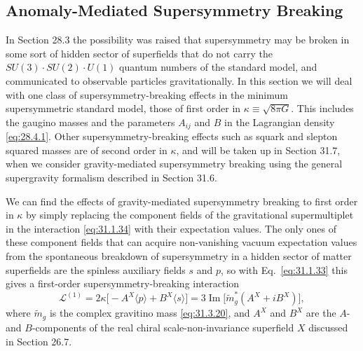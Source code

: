 
\subsection{Anomaly-Mediated Supersymmetry Breaking}

In Section 28.3 the possibility was raised that supersymmetry may be broken
in some sort of hidden sector of superfields that do not carry the
\(SU(3)\mathbin{\cdot}SU(2)\mathbin{\cdot}U(1)\) quantum numbers of the
standard model, and communicated to observable particles gravitationally.
In this section we will deal with one class of supersymmetry-breaking
effects in the minimum supersymmetric standard model, those of first order
in \(\kappa\equiv\sqrt{8\pi G}\). This includes the gaugino masses and the
parameters \(A_{ij}\) and \(B\) in the Lagrangian density
\eqref{eq:28.4.1}. Other supersymmetry-breaking effects such as squark and
slepton squared masses are of second order in \(\kappa\), and will be taken
up in Section 31.7, when we consider gravity-mediated supersymmetry breaking
using the general supergravity formalism described in Section 31.6.

We can find the effects of gravity-mediated supersymmetry breaking to first
order in \(\kappa\) by simply replacing the component fields of the
gravitational supermultiplet in the interaction \eqref{eq:31.1.34} with
their expectation values. The only ones of these component fields that can
acquire non-vanishing vacuum expectation values from the spontaneous
breakdown of supersymmetry in a hidden sector of matter superfields are the
spinless auxiliary fields \(s\) and \(p\), so with Eq.~\eqref{eq:31.1.33}
this gives a first-order supersymmetry-breaking interaction
\begin{equation}
  \mathcal L^{(1)}
  =2\kappa\bigl[-A^X\langle p\rangle+B^X\langle s\rangle\bigr]
  =3\operatorname{Im}
   \bigl[\widetilde m_g^*(A^X+iB^X)\bigr],
  \tag{31.4.1}\label{eq:31.4.1}
\end{equation}
where \(\widetilde m_g\) is the complex gravitino mass
\eqref{eq:31.3.20}, and \(A^X\) and \(B^X\) are the \(A\)- and
\(B\)-components of the real chiral scale-non-invariance superfield \(X\)
discussed in Section 26.7.

